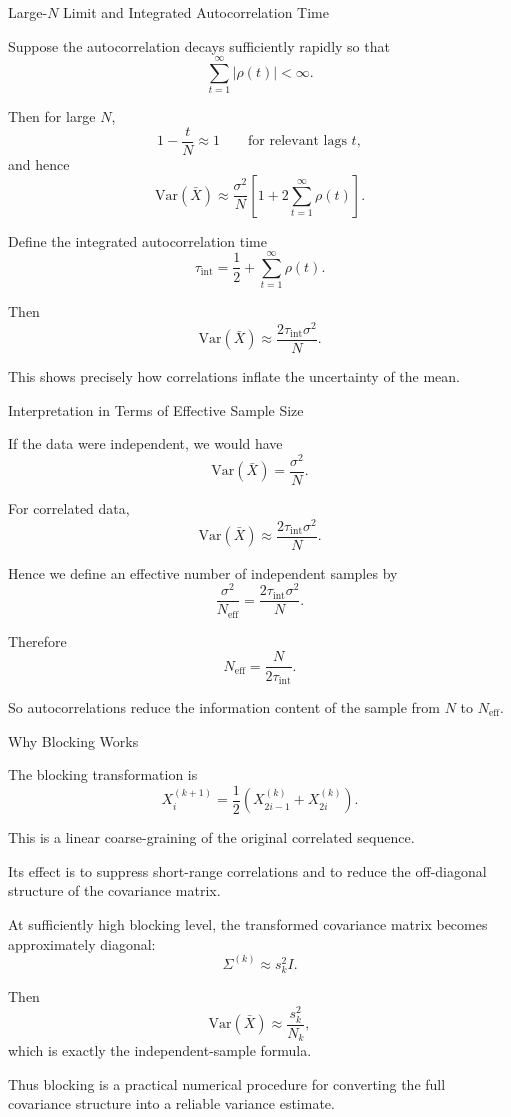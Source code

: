 \documentclass{beamer}
\begin{document}
\begin{frame}{Large-$N$ Limit and Integrated Autocorrelation Time}

Suppose the autocorrelation decays sufficiently rapidly so that
\[
\sum_{t=1}^{\infty} |\rho(t)| < \infty.
\]

Then for large $N$,
\[
1-\frac{t}{N}\approx 1
\qquad
\text{for relevant lags } t,
\]
and hence
\[
\mathrm{Var}(\bar X)
\approx
\frac{\sigma^2}{N}
\left[
1+2\sum_{t=1}^{\infty}\rho(t)
\right].
\]

Define the integrated autocorrelation time
\[
\tau_{\mathrm{int}}
=
\frac{1}{2}+\sum_{t=1}^{\infty}\rho(t).
\]

Then
\[
\mathrm{Var}(\bar X)
\approx
\frac{2\tau_{\mathrm{int}}\sigma^2}{N}.
\]

This shows precisely how correlations inflate the uncertainty of the mean.
\end{frame}

\begin{frame}{Interpretation in Terms of Effective Sample Size}

If the data were independent, we would have
\[
\mathrm{Var}(\bar X)=\frac{\sigma^2}{N}.
\]

For correlated data,
\[
\mathrm{Var}(\bar X)\approx \frac{2\tau_{\mathrm{int}}\sigma^2}{N}.
\]

Hence we define an effective number of independent samples by
\[
\frac{\sigma^2}{N_{\mathrm{eff}}}
=
\frac{2\tau_{\mathrm{int}}\sigma^2}{N}.
\]

Therefore
\[
N_{\mathrm{eff}}=\frac{N}{2\tau_{\mathrm{int}}}.
\]

So autocorrelations reduce the information content of the sample from $N$ to $N_{\mathrm{eff}}$.
\end{frame}

\begin{frame}{Why Blocking Works}

The blocking transformation is
\[
X_i^{(k+1)}=\frac{1}{2}\left(X_{2i-1}^{(k)}+X_{2i}^{(k)}\right).
\]

This is a linear coarse-graining of the original correlated sequence.

Its effect is to suppress short-range correlations and to reduce the off-diagonal structure of the covariance matrix.

At sufficiently high blocking level, the transformed covariance matrix becomes approximately diagonal:
\[
\Sigma^{(k)} \approx s_k^2 I.
\]

Then
\[
\mathrm{Var}(\bar X)
\approx \frac{s_k^2}{N_k},
\]
which is exactly the independent-sample formula.

Thus blocking is a practical numerical procedure for converting the full covariance structure into a reliable variance estimate.
\end{frame}
\end{document}
